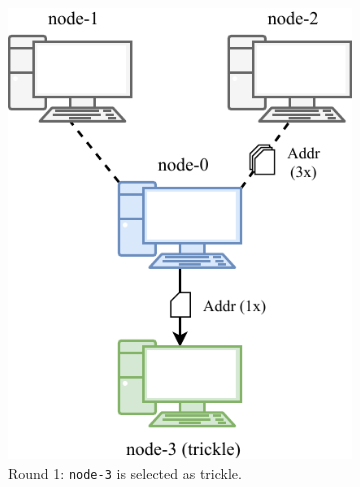 \begin{figure}[ht!]
	\begin{subfigure}{.42\textwidth}
		\vspace*{0.25cm}
		\includegraphics[width=\columnwidth]{figures/trickling_1}
		\vspace*{0.1cm}
		\caption{
			Round \num{1}:
			\texttt{node-3} is selected as trickle.
		}
		\vspace*{0.2cm}
	\end{subfigure}
	\hfill
	\begin{subfigure}{.42\textwidth}
		\vspace*{0.25cm}

\end{subfigure}
\end{figure}
